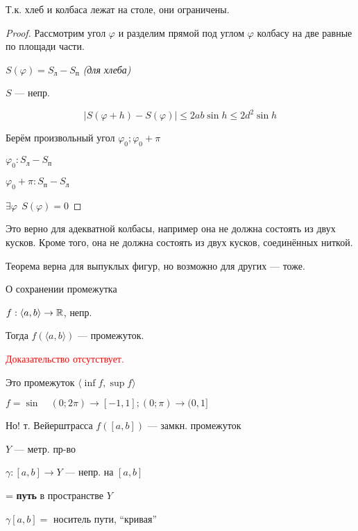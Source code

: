     \begin{remark}
        Т.к. хлеб и колбаса лежат на столе, они ограничены.
    \end{remark}
    \begin{proof}
        Рассмотрим угол $\varphi$ и разделим прямой под углом $\varphi$ колбасу на две равные по площади части.

        $S(\varphi) = S_{\text{л}}-S_{\text{п}}$ \textit{(для хлеба)}

        $S$ --- непр.

        $$|S(\varphi+h)-S(\varphi)|\leq 2ab\sin h\leq 2d^2\sin h$$

        Берём произвольный угол $\varphi_0; \varphi_0+\pi$

        $\varphi_0: S_{\text{л}} - S_{\text{п}}$

        $\varphi_0+\pi: S_{\text{п}} - S_{\text{л}}$

        $\exists \varphi \ \ S(\varphi)=0$
    \end{proof}
    \begin{remark}
        Это верно для адекватной колбасы, например она не должна состоять из двух кусков. Кроме того, она не должна состоять из двух кусков, соединённых ниткой.

        Теорема верна для выпуклых фигур, но возможно для других --- тоже.
    \end{remark}
    \begin{theorem}
        О сохранении промежутка
        
        $f:\langle a,b \rangle \to\mathbb{R}$, непр.

        Тогда $f(\langle a,b \rangle)$ --- промежуток.
    \end{theorem}
    \textcolor{red}{Доказательство отсутствует.}
    \begin{remark}
        Это промежуток $\langle \inf f, \sup f \rangle$
    \end{remark}
    \begin{remark}
        $f=\sin \quad (0; 2\pi)\to [-1, 1]; (0; \pi)\to (0, 1]$

        Но! т. Вейерштрасса $f([a,b])$ --- замкн. промежуток
    \end{remark}
    \begin{definition}
        $Y$ --- метр. пр-во
        
        $\gamma: [a,b]\to Y$ --- непр. на $[a,b]$

        = \textbf{путь} в пространстве $Y$

        $\gamma[a,b] = $ носитель пути, ``кривая''
    \end{definition}
